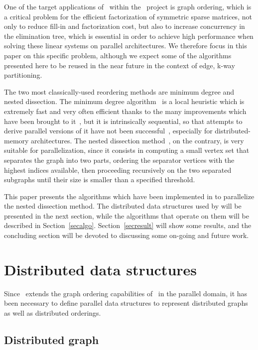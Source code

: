 \documentclass[fleqn,12pt,twoside]{article}
\begin{document}
One of the target applications of \ptscotch\ within the
\scalapplix\ project is graph ordering, which is a critical problem
for the efficient factorization of symmetric sparse matrices, not only to
reduce fill-in and factorization cost, but also to increase
concurrency in the elimination tree, which is essential in order to
achieve high performance when solving these linear systems on parallel
architectures. We therefore focus in this paper on this specific problem,
although we expect some of the algorithms presented here to
be reused in the near future in the context of edge, k-way
partitioning.

The two most classically-used reordering methods are minimum degree
and nested dissection. The minimum degree algorithm~\cite{tiwa67}
is a local heuristic which is extremely fast and very
often efficient thanks to the many improvements which have been
brought to it~\cite{amdadu96,geli89,liu-85}, but it is intrinsically
sequential, so that attempts to derive parallel versions of it have
not been successful~\cite{chgito99}, especially for distributed-memory
architectures. The nested dissection method~\cite{geli81}, on the
contrary, is very suitable for parallelization, since it consists in
computing a small vertex set that separates the graph into two parts,
ordering the separator vertices with the highest indices available,
then proceeding recursively on the two separated subgraphs until their
size is smaller than a specified threshold.

This paper presents the algorithms which have been implemented in
\ptscotch{} to parallelize the nested dissection method. The
distributed data structures used by \ptscotch{} will be presented in
the next section, while the algorithms that operate on them will be
described in Section~\ref{secalgo}. Section~\ref{secresult} will show
some results, and the concluding section will be devoted to
discussing some on-going and future work.



\section{Distributed data structures}
\label{secstruct}

Since \ptscotch\ extends the graph ordering capabilities of \scotch\
in the parallel domain, it has been necessary to define parallel data
structures to represent distributed graphs as well as distributed
orderings.

\subsection{Distributed graph}
\end{document}
